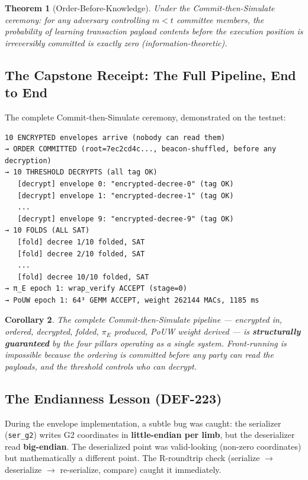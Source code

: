 \documentclass[11pt, a4paper]{article}
\newtheorem{theorem}{Theorem}
\newtheorem{corollary}[theorem]{Corollary}
\begin{document}
\begin{theorem}[Order-Before-Knowledge]
\label{thm:obk}
Under the Commit-then-Simulate ceremony: for any adversary controlling $m < t$ committee members, the probability of learning transaction payload contents before the execution position is irreversibly committed is exactly zero (information-theoretic).
\end{theorem}

\subsection{The Capstone Receipt: The Full Pipeline, End to End}

The complete Commit-then-Simulate ceremony, demonstrated on the testnet:

\begin{verbatim}
10 ENCRYPTED envelopes arrive (nobody can read them)
→ ORDER COMMITTED (root=7ec2cd4c..., beacon-shuffled, before any decryption)
→ 10 THRESHOLD DECRYPTS (all tag OK)
   [decrypt] envelope 0: "encrypted-decree-0" (tag OK)
   [decrypt] envelope 1: "encrypted-decree-1" (tag OK)
   ...
   [decrypt] envelope 9: "encrypted-decree-9" (tag OK)
→ 10 FOLDS (ALL SAT)
   [fold] decree 1/10 folded, SAT
   [fold] decree 2/10 folded, SAT
   ...
   [fold] decree 10/10 folded, SAT
→ π_E epoch 1: wrap_verify ACCEPT (stage=0)
→ PoUW epoch 1: 64³ GEMM ACCEPT, weight 262144 MACs, 1185 ms
\end{verbatim}

\begin{corollary}
The complete Commit-then-Simulate pipeline --- encrypted in, ordered, decrypted, folded, $\pi_E$ produced, PoUW weight derived --- is \textbf{structurally guaranteed} by the four pillars operating as a single system. Front-running is impossible because the ordering is committed before any party can read the payloads, and the threshold controls who can decrypt.
\end{corollary}

\subsection{The Endianness Lesson (DEF-223)}

During the envelope implementation, a subtle bug was caught: the serializer (\texttt{ser\_g2}) writes G2 coordinates in \textbf{little-endian per limb}, but the deserializer read \textbf{big-endian}. The deserialized point was valid-looking (non-zero coordinates) but mathematically a different point. The R-roundtrip check (serialize $\to$ deserialize $\to$ re-serialize, compare) caught it immediately.
\end{document}
